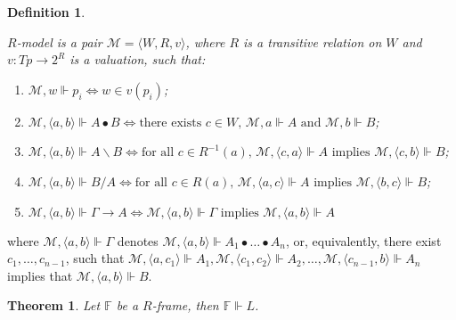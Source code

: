 \documentclass[a4paper]{article}
\theoremstyle{defin}
\newtheorem{defin}{Definition}
\theoremstyle{theorem}
\newtheorem{theorem}{Theorem}
\theoremstyle{prop}
\theoremstyle{lemma}
\theoremstyle{ex}
\theoremstyle{col}
\begin{document}
\begin{defin}
  $ $

  $R$-model is a pair $\mathcal{M} = \langle W, R, v \rangle$,
  where $R$ is a transitive relation on $W$ and $v : Tp \to 2^R$ is a valuation, such that:

  \begin{enumerate}
    \item $\mathcal{M}, w \Vdash p_i \Leftrightarrow w \in v(p_i)$;
    \item $\mathcal{M}, \langle a, b \rangle \Vdash A \bullet B \Leftrightarrow
      \text{there exists $c \in W$, $\mathcal{M}, a \Vdash A$ and $\mathcal{M}, b \Vdash B$}$;
    \item $\mathcal{M}, \langle a, b \rangle \Vdash A \backslash B \Leftrightarrow
      \text{for all $c \in R^{-1}(a)$, $\mathcal{M}, \langle c, a \rangle \Vdash A$ implies
      $\mathcal{M}, \langle c, b \rangle \Vdash B$}$;
    \item $\mathcal{M}, \langle a, b \rangle \Vdash B / A \Leftrightarrow
        \text{for all $c \in R(a)$, $\mathcal{M}, \langle a, c \rangle \Vdash A$ implies
        $\mathcal{M}, \langle b, c \rangle \Vdash B$}$;
    \item $\mathcal{M}, \langle a, b \rangle \Vdash \Gamma \rightarrow A \Leftrightarrow
    \mathcal{M}, \langle a, b \rangle \Vdash \Gamma \text{ implies } \mathcal{M}, \langle a, b \rangle \Vdash A$
  \end{enumerate}
\end{defin}

where $\mathcal{M}, \langle a, b \rangle \Vdash \Gamma$ denotes $\mathcal{M}, \langle a, b \rangle \Vdash A_1 \bullet \dots \bullet A_n$, or,
equivalently, there exist $c_1, \dots, c_{n-1}$,
such that $\mathcal{M}, \langle a, c_1 \rangle \Vdash A_1,
\mathcal{M}, \langle c_1, c_2 \rangle \Vdash A_2, \dots,
\mathcal{M}, \langle c_{n-1}, b \rangle \Vdash A_n$ implies that $\mathcal{M}, \langle a, b \rangle \Vdash B$.

\begin{theorem}
  Let $\mathbb{F}$ be a $R$-frame, then $\mathbb{F} \Vdash L$.
\end{theorem}
\end{document}
